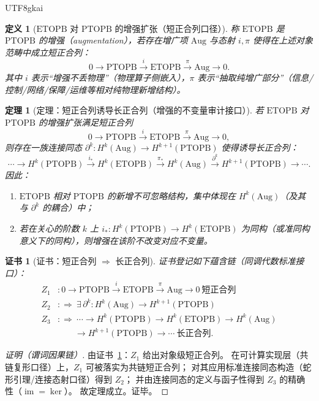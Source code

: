 \documentclass[12pt]{article}
\newtheorem{definition}{定义}[section]
\newtheorem{theorem}{定理}[section]
\newtheorem{Certificate}{证书}[section]
\newcommand{\PTOPB}{\ensuremath{\mathrm{PTOPB}}}
\newcommand{\ETOPB}{\ensuremath{\mathrm{ETOPB}}}
\newcommand{\Aug}{\ensuremath{\mathrm{Aug}}}
\begin{document}
\begin{CJK*}{UTF8}{gkai}
\begin{definition}[\ETOPB{} 对 \PTOPB{} 的增强扩张（短正合列口径）]
称 \ETOPB{} 是 \PTOPB{} 的增强（augmentation），若存在增广项 \Aug{} 与态射 $i,\pi$ 使得在上述对象范畴中成立短正合列：
\[
  0
  \longrightarrow
  \PTOPB
  \xrightarrow{i}
  \ETOPB
  \xrightarrow{\pi}
  \Aug
  \longrightarrow
  0.
\]
其中 $i$ 表示“增强不丢物理”（物理算子侧嵌入），$\pi$ 表示“抽取纯增广部分”（信息/控制/网络/保障/运维等相对纯物理新增结构）。
\end{definition}

\begin{theorem}[定理：短正合列诱导长正合列（增强的不变量审计接口）]
\label{thm:short-exact-implies-long-exact}
若 \ETOPB{} 对 \PTOPB{} 的增强扩张满足短正合列
\[
  0\to\PTOPB\xrightarrow{i}\ETOPB\xrightarrow{\pi}\Aug\to 0,
\]
则存在一族连接同态 $\partial^k:H^k(\Aug)\to H^{k+1}(\PTOPB)$ 使得诱导长正合列：
\[
  \cdots
  \to H^k(\PTOPB)
  \xrightarrow{i_*}
  H^k(\ETOPB)
  \xrightarrow{\pi_*}
  H^k(\Aug)
  \xrightarrow{\partial^k}
  H^{k+1}(\PTOPB)
  \to \cdots .
\]
因此：
\begin{enumerate}
  \item \ETOPB{} 相对 \PTOPB{} 的新增不可忽略结构，集中体现在 $H^k(\Aug)$（及其与 $\partial^k$ 的耦合）中；
  \item 若在关心的阶数 $k$ 上 $i_*:H^k(\PTOPB)\to H^k(\ETOPB)$ 为同构（或准同构意义下的同构），则增强在该阶不改变对应不变量。
\end{enumerate}
\end{theorem}

\begin{Certificate}[证书：短正合列 $\Rightarrow$ 长正合列]
\label{cert:short-exact-implies-long-exact}
证书登记如下蕴含链（同调代数标准接口）：
\[
\begin{aligned}
  Z_1 &: 0\to \PTOPB \xrightarrow{i} \ETOPB \xrightarrow{\pi} \Aug \to 0\ \text{短正合列}\\
  Z_2 &: \Rightarrow\ \exists\,\partial^k:H^k(\Aug)\to H^{k+1}(\PTOPB)\\
  Z_3 &: \Rightarrow\ \cdots\to H^k(\PTOPB)\to H^k(\ETOPB)\to H^k(\Aug)\\
      &\qquad \to H^{k+1}(\PTOPB)\to\cdots\ \text{长正合列}.
\end{aligned}
\]
\end{Certificate}

\begin{proof}[证明（谓词因果链）]
由证书~\ref{cert:short-exact-implies-long-exact}：$Z_1$ 给出对象级短正合列。
在可计算实现层（共链复形口径）上，$Z_1$ 可被落实为共链短正合列；
对其应用标准连接同态构造（蛇形引理/连接态射口径）得到 $Z_2$；
并由连接同态的定义与函子性得到 $Z_3$ 的精确性（$\operatorname{im}=\ker$）。
故定理成立。证毕。
\end{proof}


\end{CJK*}
\end{document}
